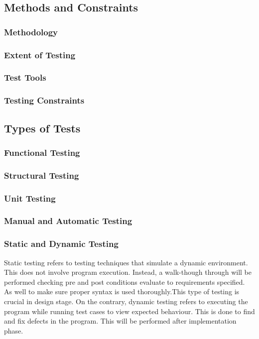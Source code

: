 \documentclass[12pt]{article}
\begin{document}
\subsection{ Methods and Constraints} 

\subsubsection{Methodology} 

\subsubsection{Extent of Testing}

\subsubsection{Test Tools}


\subsubsection{ Testing Constraints}

\subsection{Types of Tests}

\subsubsection{Functional Testing}

\subsubsection{Structural Testing}

\subsubsection{Unit Testing}

\subsubsection{Manual and Automatic Testing}

\subsubsection{Static and Dynamic Testing}
Static testing refers to testing techniques that simulate a dynamic environment. This does not involve program execution. Instead, a walk-though through will be performed checking pre and post conditions evaluate to requirements specified. As well to make sure proper syntax is used thoroughly.This type of testing is crucial in design stage. On the contrary, dynamic testing refers to executing the program while running test cases to view expected behaviour. This is done to find and fix defects in the program. This will be performed after implementation phase. 
\end{document}
